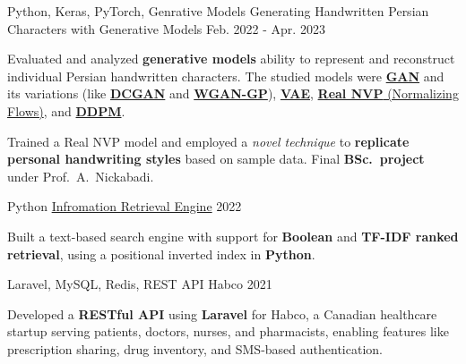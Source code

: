 

\begin{cventries}

  \cventry
    {Python, Keras, PyTorch, Genrative Models} %
    {Generating Handwritten Persian Characters with Generative Models} %
    {} %
    {Feb. 2022 - Apr. 2023} %
    {
      \begin{cvitems} %
      	\item {Evaluated and analyzed  \textbf{generative models} ability to represent and reconstruct individual Persian handwritten characters. The studied models were \href{https://arxiv.org/abs/1406.2661}{\textbf{GAN}} and its variations (like \href{https://arxiv.org/abs/1511.06434}{\textbf{DCGAN}} and \href{https://arxiv.org/abs/1704.00028}{\textbf{WGAN-GP}}), \href{https://arxiv.org/abs/1312.6114}{\textbf{VAE}}, \href{https://arxiv.org/abs/1605.08803}{\textbf{Real NVP} (Normalizing Flows)}, and \href{https://arxiv.org/abs/2006.11239}{\textbf{DDPM}}.}
      	\item{Trained a Real NVP model and employed a \textit{novel technique} to \textbf{replicate personal handwriting styles} based on sample data. Final \textbf{BSc.~project} under Prof.~A.~Nickabadi.}
      \end{cvitems}
    }

  \cventry
    {Python} %
    {\href{https://github.com/radinshayanfar/AUT-IR}{Infromation Retrieval Engine}} %
    {} %
    {2022} %
    {
      \begin{cvitems} %
      	\item {Built a text-based search engine with support for \textbf{Boolean} and \textbf{TF-IDF ranked retrieval}, using a positional inverted index in \textbf{Python}.}
      \end{cvitems}
    }
    
  \cventry
    {Laravel, MySQL, Redis, REST API} %
    {Habco} %
    {} %
    {2021} %
    {
      \begin{cvitems} %
      	\item {Developed a \textbf{RESTful API} using \textbf{Laravel} for Habco, a Canadian healthcare startup serving patients, doctors, nurses, and pharmacists, enabling features like prescription sharing, drug inventory, and SMS-based authentication.}
      \end{cvitems}
    }


\end{cventries}
